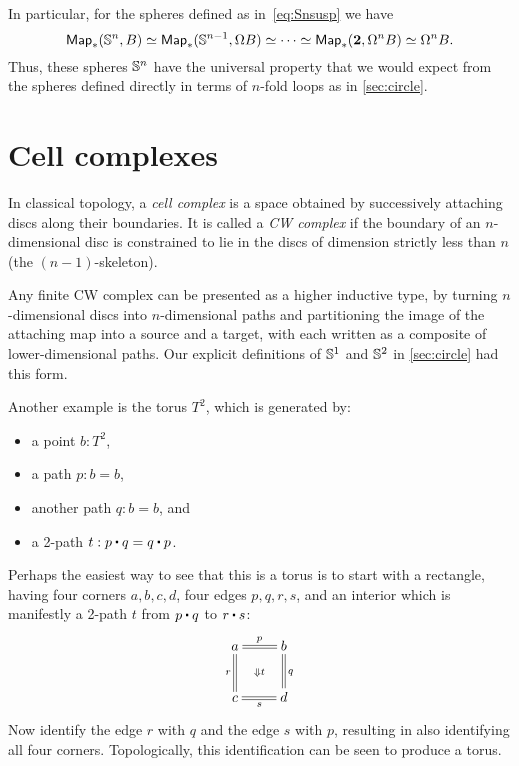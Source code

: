 In particular, for the spheres defined as in~\eqref{eq:Snsusp} we have
\[ \mathsf{Map}_*(\mathbb{S}^n,B) \simeq \mathsf{Map}_*(\mathbb{S}^{n-1}, \Omega B) \simeq \cdots \simeq \mathsf{Map}_*(\mathbf{2},\Omega^n B) \simeq \Omega^n B. \]
Thus, these spheres $\mathbb{S}^n$ have the universal property that we would expect from the spheres defined directly in terms of $n$-fold loops as in \autoref{sec:circle}.


\section{Cell complexes}
\label{sec:cell-complexes}

%
%
In classical topology, a \emph{cell complex} is a space obtained by successively attaching discs along their boundaries.
It is called a \emph{CW complex} if the boundary of an $n$-dimensional disc is constrained to lie in the discs of dimension strictly less than $n$ (the $(n-1)$-skeleton).

Any finite CW complex can be presented as a higher inductive type, by turning $n$-dimensional discs into $n$-dimensional paths and partitioning the image of the attaching map into a source and a target, with each written as a composite of lower-dimensional paths.
Our explicit definitions of $\mathbb{S}^1$ and $\mathbb{S}^2$ in \autoref{sec:circle} had this form.

%
Another example is the torus $T^2$, which is generated by:
\begin{itemize}
\item a point $b:T^2$,
\item a path $p:b=b$,
\item another path $q:b=b$, and
\item a 2-path $t: p\ct q = q \ct p$.
\end{itemize}
Perhaps the easiest way to see that this is a torus is to start with a rectangle, having four corners $a,b,c,d$, four edges $p,q,r,s$, and an interior which is manifestly a 2-path $t$ from $p\ct q$ to $r\ct s$:
\begin{equation*}
  \vcenter{\xymatrix{
      a\ar@{=}[r]^p\ar@{=}[d]_r \ar@{}[dr]|{\Downarrow t} &
      b\ar@{=}[d]^q\\
      c\ar@{=}[r]_s &
      d
      }}
\end{equation*}
Now identify the edge $r$ with $q$ and the edge $s$ with $p$, resulting in also identifying all four corners.
Topologically, this identification can be seen to produce a torus.

